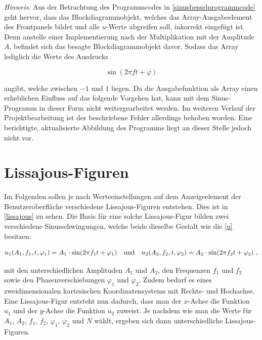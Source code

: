 \documentclass[
a4paper,
12pt,
pagesize,
ngerman
]{scrartcl}
\begin{document}
	\emph{Hinweis:} Aus der Betrachtung des Programmcodes in \cref{sinusbesselprogrammcode} geht hervor, dass das Blockdiagrammobjekt, welches das Array-Ausgabeelement des Frontpanels bildet und alle $u$-Werte abgreifen soll, inkorrekt eingefügt ist. Denn anstelle einer Implementierung nach der Multiplikation mit der Amplitude $A$, befindet sich das besagte Blockdiagrammobjekt davor. Sodass das Array lediglich die Werte des Ausdrucks
	
	\begin{equation}
	\sin(2\pi f t + \varphi)
	\end{equation}
	
	\noindent angibt, welche zwischen $-1$ und $1$ liegen. Da die Ausgabefunktion als Array einen erheblichen Einfluss auf das folgende Vorgehen hat, kann mit dem Sinus-Programm in dieser Form nicht weitergearbeitet werden. Im weiteren Verlauf der Projektbearbeitung ist der beschriebene Fehler allerdings behoben worden. Eine berichtigte, aktualisierte Abbildung des Programms liegt an dieser Stelle jedoch nicht vor.
	\label{sinus_amp_fehler}
	
	\newpage
	
	
	\section{Lissajous-Figuren}
	
	Im Folgenden sollen je nach Werteeinstellungen auf dem Anzeigeelement der Benutzeroberfläche verschiedene Lissajous-Figuren entstehen. Dies ist in \cref{lissajous} zu sehen. Die Basis für eine solche Lissajous-Figur bilden zwei verschiedene Sinusschwingungen, welche beide dieselbe Gestalt wie die \cref{u} besitzen:
	
	\begin{equation} \label{u1u2}
	u_1(A_1,f_1,t,\varphi_1) = A_1 \cdot \sin(2\pi f_1 t + \varphi_1) \ \ \ \textnormal{und} \ \ \ u_2(A_2,f_2,t,\varphi_2) = A_2 \cdot \sin(2\pi f_2 t + \varphi_2) \ ,
	\end{equation}
	
	\noindent mit den unterschiedlichen Amplituden $A_1$ und $A_2$, den Frequenzen $f_1$ und $f_2$ sowie den Phasenverschiebungen $\varphi_1$ und $\varphi_2$. Zudem bedarf es eines zweidimensionalen kartesischen Koordinatensystems mit Rechts- und Hochachse. Eine Lissajous-Figur entsteht nun dadurch, dass man der $x$-Achse die Funktion $u_1$ und der $y$-Achse die Funktion $u_2$ zuweist. Je nachdem wie man die Werte für $A_1$, $A_2$, $f_1$, $f_2$, $\varphi_1$, $\varphi_2$ und $N$ wählt, ergeben sich dann unterschiedliche Lissajous-Figuren.
	
\end{document}
